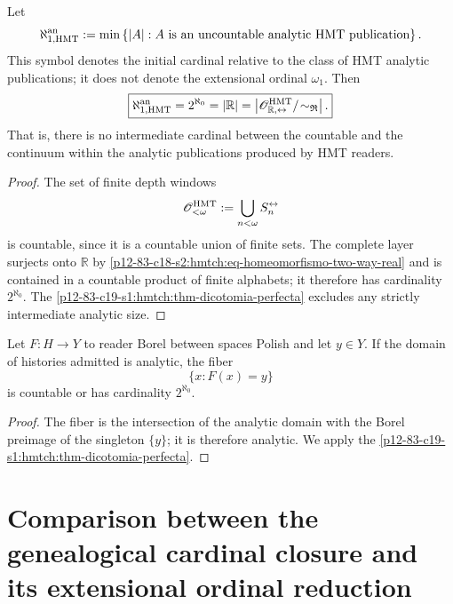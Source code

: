 \begin{corollary}
\label{p12-83-c19-s1:hmtch:cor-ch-analitica-hmt}
Let
\begin{equation}
 \aleph_{1,\mathrm{HMT}}^{\rm an}
 :=\min\left\{|A|:
 A\text{ is an uncountable analytic HMT publication}\right\}.
 \label{p12-83-c19-s1:hmtch:eq-aleph1-analitico-hmt}
\end{equation}
This symbol denotes the initial cardinal relative to the class of HMT analytic
publications; it does not denote the extensional ordinal \(\omega_1\).
Then
\begin{equation}
 \boxed{
 \aleph_{1,\mathrm{HMT}}^{\rm an}
 =2^{\aleph_0}
 =|\mathbb R|
 =\left|\mathscr O_{\mathbb R,\leftrightarrow}^{\rm HMT}/
 \!\sim_{\mathfrak R}\right|.}
 \label{p12-83-c19-s1:hmtch:eq-ch-analitica-hmt}
\end{equation}
That is, there is no intermediate cardinal between the countable and the continuum
within the analytic publications produced by HMT readers.
\end{corollary}

\begin{proof}
The set of finite depth windows
\[
 \mathscr O_{<\omega}^{\rm HMT}
 :=\bigcup_{n<\omega}S_n^{\leftrightarrow}
\]
is countable, since it is a countable union of finite sets. The complete layer
surjects onto \(\mathbb R\) by
\eqref{p12-83-c18-s2:hmtch:eq-homeomorfismo-two-way-real} and is contained in a countable product
of finite alphabets; it therefore has cardinality
\(2^{\aleph_0}\). The
\cref{p12-83-c19-s1:hmtch:thm-dicotomia-perfecta} excludes any strictly intermediate analytic
size.
\end{proof}

\begin{corollary}
\label{p12-83-c19-s1:hmtch:cor-dicotomia-fibras}
Let \(F:H\to Y\) to reader Borel between spaces Polish and let
\(y\in Y\). If the domain of histories admitted is analytic, the fiber
\[
 \{x:F(x)=y\}
\]
is countable or has cardinality \(2^{\aleph_0}\).
\end{corollary}

\begin{proof}
The fiber is the intersection of the analytic domain with the Borel preimage of the singleton \(\{y\}\); it is therefore analytic. We apply the
\cref{p12-83-c19-s1:hmtch:thm-dicotomia-perfecta}.
\end{proof}

\section{Comparison between the genealogical cardinal closure and its extensional ordinal reduction}


